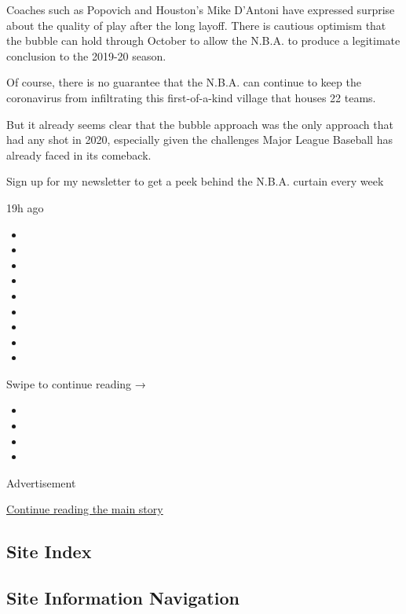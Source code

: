 Coaches such as Popovich and Houston's Mike D'Antoni have expressed
surprise about the quality of play after the long layoff. There is
cautious optimism that the bubble can hold through October to allow the
N.B.A. to produce a legitimate conclusion to the 2019-20 season.

Of course, there is no guarantee that the N.B.A. can continue to keep
the coronavirus from infiltrating this first-of-a-kind village that
houses 22 teams.

But it already seems clear that the bubble approach was the only
approach that had any shot in 2020, especially given the challenges
Major League Baseball has already faced in its comeback.

\href{https://www.nytimes3xbfgragh.onion/newsletters/signup/MSB}{}

Sign up for my newsletter to get a peek behind the N.B.A. curtain every
week

19h ago

\begin{itemize}
\item
\item
\item
\item
\item
\item
\item
\item
\item
\end{itemize}

Swipe to continue reading →

\begin{itemize}
\item
\item
\item
\item
\end{itemize}

Advertisement

\protect\hyperlink{after-bottom}{Continue reading the main story}

\hypertarget{site-index}{%
\subsection{Site Index}\label{site-index}}

\hypertarget{site-information-navigation}{%
\subsection{Site Information
Navigation}\label{site-information-navigation}}

